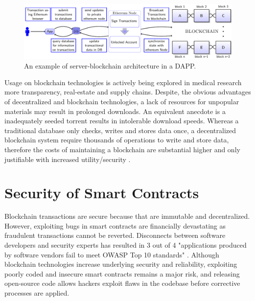 \documentclass[12pt]{scrreprt}
\begin{document}
\begin{figure}[ht]
\centering
\includegraphics[width=1\linewidth]{ms-II/blockchainInSimpleApp.pdf}
\caption{An example of server-blockchain architecture in a DAPP.}
\label{fig:DApp}
\end{figure}
Usage on blockchain technologies is actively being explored in medical research \cite{pmid28357041} more transparency, real-estate and supply chains.
Despite, the obvious advantages of decentralized and blockchain technologies,  a lack of resources for unpopular materials may result in prolonged downloads. An equivalent anecdote is a inadequately seeded torrent results in intolerable download speeds.  Whereas a traditional database only checks, writes and stores data once, a decentralized blockchain system require thousands of operations to write and store data, therefore the costs of maintaining a blockchain are substantial higher and only justifiable with increased utility/security \cite{EthScale:Online}. 

 \section{Security of Smart Contracts}
 
 Blockchain transactions are secure because that are immutable and decentralized. However, exploiting bugs in smart contracts are financially devastating \cite{funnyJoke:Online} as fraudulent transactions cannot be reverted. Disconnects between software developers and security experts has resulted in 3 out of 4 "applications produced by software vendors fail to meet OWASP Top 10 standards" \cite{veraCode:Report}. Although blockchain technologies increase underlying security and reliability, exploiting poorly coded and insecure smart contracts remains a major risk, and releasing open-source code allows hackers exploit flaws in the codebase before corrective processes are applied.  
\end{document}
